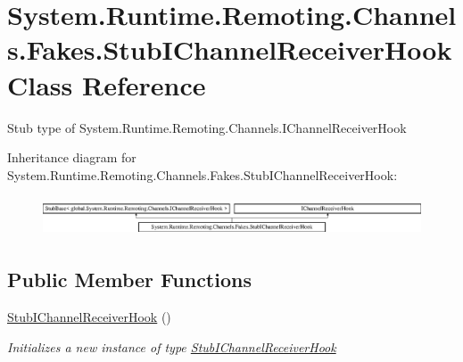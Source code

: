\hypertarget{class_system_1_1_runtime_1_1_remoting_1_1_channels_1_1_fakes_1_1_stub_i_channel_receiver_hook}{\section{System.\-Runtime.\-Remoting.\-Channels.\-Fakes.\-Stub\-I\-Channel\-Receiver\-Hook Class Reference}
\label{class_system_1_1_runtime_1_1_remoting_1_1_channels_1_1_fakes_1_1_stub_i_channel_receiver_hook}
}


Stub type of System.\-Runtime.\-Remoting.\-Channels.\-I\-Channel\-Receiver\-Hook 


Inheritance diagram for System.\-Runtime.\-Remoting.\-Channels.\-Fakes.\-Stub\-I\-Channel\-Receiver\-Hook\-:\begin{figure}[H]
\begin{center}
\leavevmode
\includegraphics[height=1.194030cm]{class_system_1_1_runtime_1_1_remoting_1_1_channels_1_1_fakes_1_1_stub_i_channel_receiver_hook}
\end{center}
\end{figure}
\subsection*{Public Member Functions}
\begin{DoxyCompactItemize}
\item 
\hyperlink{class_system_1_1_runtime_1_1_remoting_1_1_channels_1_1_fakes_1_1_stub_i_channel_receiver_hook_aaa4da39bc4bc223ca7071fdab14d7bb0}{Stub\-I\-Channel\-Receiver\-Hook} ()
\begin{DoxyCompactList}\small\item\em Initializes a new instance of type \hyperlink{class_system_1_1_runtime_1_1_remoting_1_1_channels_1_1_fakes_1_1_stub_i_channel_receiver_hook}{Stub\-I\-Channel\-Receiver\-Hook}\end{DoxyCompactList}\end{DoxyCompactItemize}
